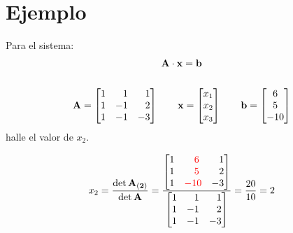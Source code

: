 \documentclass[11pt]{article}
\begin{document}
\section{Ejemplo}
Para el sistema:
\begin{gather*}
    \bf A\cdot x = b\\
    \\
    \mathbf{A} = \begin{bmatrix}
        1 & \hphantom{{-}}1 & \hphantom{{-}}1 \\
        1 & {-}1 & \hphantom{{-}}2 \\
        1 & {-}1 & {-}3 
        \end{bmatrix} \qquad
    \mathbf{x} = \begin{bmatrix}
        x_1\\ x_2\\ x_3
        \end{bmatrix} \qquad
    \mathbf{b} = \begin{bmatrix}
        6\\
        5\\
        {-}10
        \end{bmatrix}
\end{gather*}
halle el valor de \(x_2\).
\vspace*{1cm}
\begin{tcolorbox}
    \begin{equation*}
        x_2 = \frac{\det{\mathbf{A_{(2)}}}}%
        {\det{\mathbf{A}}} =%
        \frac{\begin{bmatrix}
            1 & \textcolor{red}{\hphantom{{-}}6} & \hphantom{{-}}1 \\
            1 & \textcolor{red}{\hphantom{{-}}5} & \hphantom{{-}}2 \\
            1 & \textcolor{red}{{-}10} & {-}3 
            \end{bmatrix}}{\begin{bmatrix}
                1 & \hphantom{{-}}1 & \hphantom{{-}}1 \\
                1 & {-}1 & \hphantom{{-}}2 \\
                1 & {-}1 & {-}3 
                \end{bmatrix}} = \frac{20}{10}=%
            2
    \end{equation*}
\end{tcolorbox}
\end{document}

